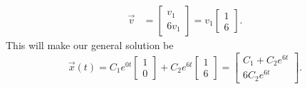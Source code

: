 \begin{eg}
\begin{align*}
    \vec{v}&=\begin{bmatrix} v_1\\6v_1 \end{bmatrix}=v_1\begin{bmatrix} 1\\6 \end{bmatrix}  
  .\end{align*}
  This will make our general solution be \[
    \vec{x}(t)=C_1e^{0t}\begin{bmatrix} 1\\0 \end{bmatrix} +C_2e^{6t}\begin{bmatrix} 1\\6 \end{bmatrix} = \begin{bmatrix} C_1+C_2e^{6t}\\6C_2e^{6t} \end{bmatrix} 
  .\] 
\end{eg}
